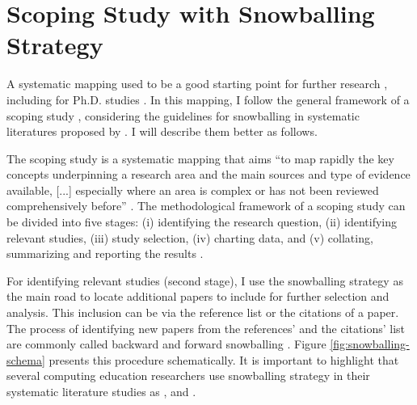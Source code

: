 \section{Scoping Study with Snowballing Strategy}
\label{rel-work:scoping-snowball}

A systematic mapping used to be a good starting point for further research \cite{kitchenham:2011}, including for Ph.D. studies \cite{kitchenham:2010}. In this mapping, I follow the general framework of a scoping study \cite{arksey:2005}, considering the guidelines for snowballing in systematic literatures proposed by . I will describe them better as follows.

The scoping study is a systematic mapping that aims “to map rapidly the key concepts underpinning a research area and the main sources and type of evidence available, [...] especially where an area is complex or has not been reviewed comprehensively before” \cite[p.~21]{arksey:2005}. The methodological framework of a scoping study can be divided into five stages: (i) identifying the research question, (ii) identifying relevant studies, (iii) study selection, (iv) charting data, and (v) collating, summarizing and reporting the results \cite[p.~22]{arksey:2005}.

For identifying relevant studies (second stage), I use the snowballing strategy as the main road to locate additional papers to include for further selection and analysis. This inclusion can be via the reference list or the citations of a paper. The process of identifying new papers from the references’ and the citations’ list are commonly called backward and forward snowballing \cite[p.~1]{wohlin:2014}. Figure \ref{fig:snowballing-schema} presents this procedure schematically. It is important to highlight that several computing education researchers use snowballing strategy in their systematic literature studies as ,  and .

